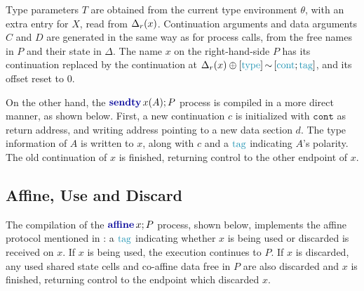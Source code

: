 Type parameters $T$ are obtained from the current type environment $\theta$, with an extra entry for $X$, read from $\Delta_r(x)$. Continuation arguments and data arguments $C$ and $D$ are generated in the same way as for process calls, from the free names in $P$ and their state in $\Delta$. The name $x$ on the right-hand-side $P$ has its continuation replaced by the continuation at $\concatst{\readlocof{\Delta}{x}}{\slotoffset{\seqst{\types}}{\seqst{\conts; \tags}}}$, and its offset reset to $0$.

On the other hand, the $\sendtyc{x}{A}{P}$ process is compiled in a more direct manner, as shown below. First, a new continuation $c$ is initialized with $\texttt{cont}$ as return address, and writing address pointing to a new data section $d$. The type information of $A$ is written to $x$, along with $c$ and a $\tags$ indicating $A$'s polarity. The old continuation of $x$ is finished, returning control to the other endpoint of $x$.
\begin{compilation}{\theta}{\Delta}{}
{}
     
\end{compilation}

\subsection{Affine, Use and Discard}

The compilation of the $\affinec{x}P$ process, shown below, implements the affine protocol mentioned in : a $\tags$ indicating whether $x$ is being used or discarded is received on $x$. If $x$ is being used, the execution continues to $P$. If $x$ is discarded, any used shared state cells and co-affine data free in $P$ are also discarded and $x$ is finished, returning control to the endpoint which discarded $x$.
\begin{compilation}{\theta}{\Delta}{}
{}
     
     
     
\end{compilation}

